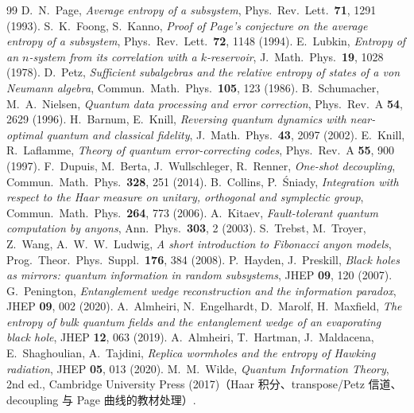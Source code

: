 \documentclass[11pt,a4paper]{ctexart}
\theoremstyle{definition}
\begin{document}
\begin{thebibliography}{99}
 D.~N.~Page, \textit{Average entropy of a subsystem}, Phys.\ Rev.\ Lett.\ \textbf{71}, 1291 (1993).
 S.~K.~Foong, S.~Kanno, \textit{Proof of Page's conjecture on the average entropy of a subsystem}, Phys.\ Rev.\ Lett.\ \textbf{72}, 1148 (1994).
 E.~Lubkin, \textit{Entropy of an $n$-system from its correlation with a $k$-reservoir}, J.\ Math.\ Phys.\ \textbf{19}, 1028 (1978).
 D.~Petz, \textit{Sufficient subalgebras and the relative entropy of states of a von Neumann algebra}, Commun.\ Math.\ Phys.\ \textbf{105}, 123 (1986).
 B.~Schumacher, M.~A.~Nielsen, \textit{Quantum data processing and error correction}, Phys.\ Rev.\ A \textbf{54}, 2629 (1996).
 H.~Barnum, E.~Knill, \textit{Reversing quantum dynamics with near-optimal quantum and classical fidelity}, J.\ Math.\ Phys.\ \textbf{43}, 2097 (2002).
 E.~Knill, R.~Laflamme, \textit{Theory of quantum error-correcting codes}, Phys.\ Rev.\ A \textbf{55}, 900 (1997).
 F.~Dupuis, M.~Berta, J.~Wullschleger, R.~Renner, \textit{One-shot decoupling}, Commun.\ Math.\ Phys.\ \textbf{328}, 251 (2014).
 B.~Collins, P.~\'Sniady, \textit{Integration with respect to the Haar measure on unitary, orthogonal and symplectic group}, Commun.\ Math.\ Phys.\ \textbf{264}, 773 (2006).
 A.~Kitaev, \textit{Fault-tolerant quantum computation by anyons}, Ann.\ Phys.\ \textbf{303}, 2 (2003).
 S.~Trebst, M.~Troyer, Z.~Wang, A.~W.~W.~Ludwig, \textit{A short introduction to Fibonacci anyon models}, Prog.\ Theor.\ Phys.\ Suppl.\ \textbf{176}, 384 (2008).
 P.~Hayden, J.~Preskill, \textit{Black holes as mirrors: quantum information in random subsystems}, JHEP \textbf{09}, 120 (2007).
 G.~Penington, \textit{Entanglement wedge reconstruction and the information paradox}, JHEP \textbf{09}, 002 (2020).
 A.~Almheiri, N.~Engelhardt, D.~Marolf, H.~Maxfield, \textit{The entropy of bulk quantum fields and the entanglement wedge of an evaporating black hole}, JHEP \textbf{12}, 063 (2019).
 A.~Almheiri, T.~Hartman, J.~Maldacena, E.~Shaghoulian, A.~Tajdini, \textit{Replica wormholes and the entropy of Hawking radiation}, JHEP \textbf{05}, 013 (2020).
 M.~M.~Wilde, \textit{Quantum Information Theory}, 2nd ed., Cambridge University Press (2017)（Haar 积分、transpose/Petz 信道、decoupling 与 Page 曲线的教材处理）.
\end{thebibliography}
\end{document}
